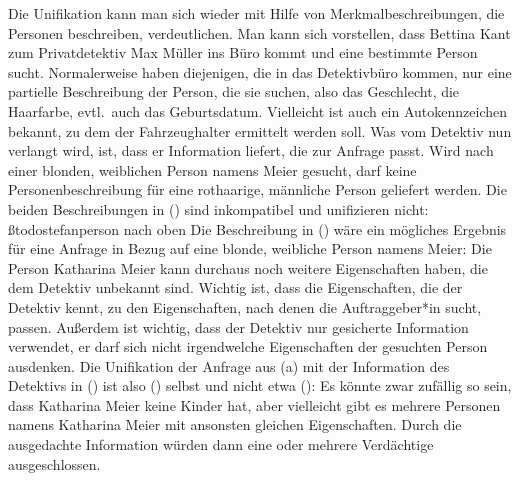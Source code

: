 Die Unifikation kann man sich wieder mit Hilfe von Merkmalbeschreibungen, die Personen beschreiben, verdeutlichen.
Man kann sich vorstellen, dass Bettina Kant zum Privatdetektiv Max Müller ins Büro kommt und eine
bestimmte Person sucht. Normalerweise haben diejenigen, die in das Detektivbüro kommen, nur eine
partielle Beschreibung der Person, die sie suchen, also \zb das Geschlecht, die Haarfarbe, evtl.\
auch das Geburtsdatum. Vielleicht ist auch ein Autokennzeichen bekannt, zu dem der Fahrzeughalter
ermittelt werden soll.
Was vom Detektiv nun verlangt wird, ist, dass er Information liefert, die zur Anfrage passt. Wird
nach einer blonden, weiblichen Person namens Meier gesucht, darf keine Personenbeschreibung für eine rothaarige,
männliche Person geliefert werden. Die beiden Beschreibungen in (\mex{1}) sind inkompatibel und unifizieren nicht:
\eal
\ex {}ßtodostefan{person nach oben}
\ex {}
\zl
\largerpage
Die Beschreibung in () wäre ein mögliches Ergebnis für eine Anfrage in Bezug auf eine blonde, weibliche Person namens Meier:
\ea
{}
\z
Die Person Katharina Meier kann durchaus noch weitere Eigenschaften haben, die dem Detektiv unbekannt sind.
Wichtig ist, dass die Eigenschaften, die der Detektiv kennt, zu den Eigenschaften, nach denen die Auftraggeber*in sucht,
passen. Außerdem ist wichtig, dass der Detektiv nur gesicherte Information verwendet, er darf sich nicht irgendwelche
Eigenschaften der gesuchten Person ausdenken. Die Unifikation der Anfrage aus (\mex{-1}a) mit der Information
des Detektivs in (\mex{0}) ist also (\mex{0}) selbst und nicht etwa (\mex{1}):
\ea
{}
\z
Es könnte zwar zufällig so sein, dass Katharina Meier keine Kinder hat, 
aber vielleicht gibt es mehrere Personen
namens Katharina Meier mit ansonsten gleichen Eigenschaften. 
Durch die ausgedachte Information würden dann eine oder mehrere Verdächtige ausgeschlossen.

